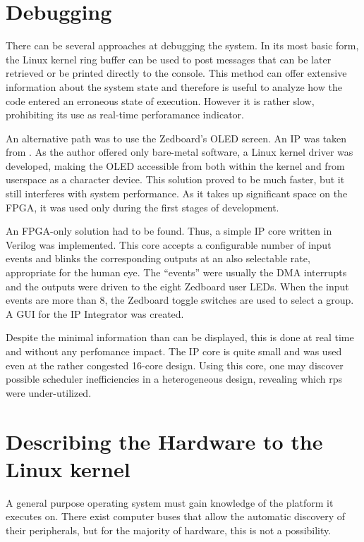 \section{Debugging}

There can be several approaches at debugging the system. In its most basic form,
the Linux kernel ring buffer can be used to post messages that can be later retrieved
or be printed directly to the console. This method can offer extensive information
about the system state and therefore is useful to analyze how the code entered an
erroneous state of execution. However it is rather slow, prohibiting its use as
real-time perforamance indicator.

An alternative path was to use the Zedboard's OLED screen. An IP was taken from \cite{zedboard-oled}.
As the author offered only bare-metal software, a Linux kernel driver was developed,
making the OLED accessible from both within the kernel and from userspace as a character device.
This solution proved to be much faster, but it still interferes with system performance.
As it takes up significant space on the FPGA, it was used only during the first stages of development.

An FPGA-only solution had to be found. Thus, a simple IP core written in Verilog was implemented.
This core accepts a configurable number of input events and blinks the corresponding outputs
at an also selectable rate, appropriate for the human eye. The ``events'' were usually the
DMA interrupts and the outputs were driven to the eight Zedboard user LEDs. When the input events
are more than 8, the Zedboard toggle switches are used to select a group.
A GUI for the IP Integrator was created.

Despite the minimal information than can be displayed, this is done at real time and without
any perfomance impact. The IP core is quite small and was used even at the rather congested 16-core design.
Using this core, one may discover possible scheduler inefficiencies in a heterogeneous design,
revealing which \glspl{rp} were under-utilized.

\section{Describing the Hardware to the Linux kernel}

A general purpose operating system must gain knowledge of the platform it executes on.
There exist computer buses that allow the automatic discovery of their peripherals, 
but for the majority of hardware, this is not a possibility.

